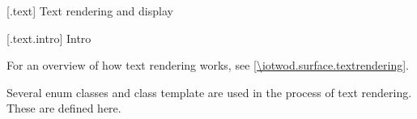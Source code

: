 
 [\iotwod.text] {Text rendering and display}


 [\iotwod.text.intro] {Intro}

\pnum
For an overview of how text rendering works, see \ref{\iotwod.surface.textrendering}.

\pnum
Several enum classes and class template are used in the process of text rendering. These are defined here.

\addtocounter{SectionDepthBase}{1}












\addtocounter{SectionDepthBase}{-1}
